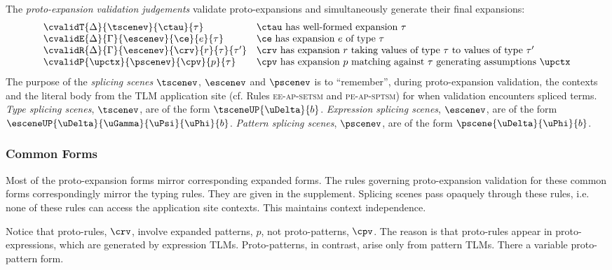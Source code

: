 \documentclass[acmsmall,10pt,review,anonymous]{acmart}\settopmatter{printfolios=true}
\begin{document}
The \emph{proto-expansion validation judgements} validate proto-expansions and simultaneously generate their final expansions:%
\[\begin{array}{ll}
\cvalidT{\Delta}{\tscenev}{\ctau}{\tau} & \text{$\ctau$ has well-formed expansion $\tau$}\\
\cvalidE{\Delta}{\Gamma}{\escenev}{\ce}{e}{\tau} & \text{$\ce$ has expansion $e$ of type $\tau$}\\
\cvalidR{\Delta}{\Gamma}{\escenev}{\crv}{r}{\tau}{\tau'} & \text{$\crv$ has expansion $r$ taking values of type $\tau$ to values of type $\tau'$}\\
\cvalidP{\upctx}{\pscenev}{\cpv}{p}{\tau} & \text{$\cpv$ has expansion $p$ matching against $\tau$ generating assumptions $\upctx$}
\end{array}\]
The purpose of the \emph{splicing scenes} $\tscenev$, $\escenev$ and $\pscenev$ is to ``remember'', during proto-expansion validation, the contexts and the literal body from the TLM application site (cf. Rules \textsc{ee-ap-setsm} and \textsc{pe-ap-sptsm}) for when validation encounters spliced terms. \emph{Type splicing scenes}, $\tscenev$, are of the form $\tsceneUP{\uDelta}{b}$. \emph{Expression splicing scenes}, $\escenev$, are of the form $\esceneUP{\uDelta}{\uGamma}{\uPsi}{\uPhi}{b}$. \emph{Pattern splicing scenes}, $\pscenev$, are of the form $\pscene{\uDelta}{\uPhi}{b}$. 

\subsubsection{Common Forms} Most of the proto-expansion forms mirror corresponding expanded forms. The rules governing proto-expansion validation for these common forms correspondingly mirror the typing rules. They are given in the supplement. Splicing scenes pass opaquely through these rules, i.e. none of these rules can access the application site contexts. This maintains context independence. 

Notice that proto-rules, $\crv$, involve expanded patterns, $p$, not proto-patterns, $\cpv$. The reason is that proto-rules appear in proto-expressions, which are generated by expression TLMs. Proto-patterns, in contrast, arise only from pattern TLMs. There a variable proto-pattern form.
\end{document}
